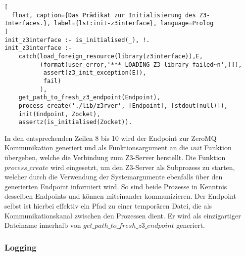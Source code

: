 \begin{lstlisting}[
  float, caption={Das Prädikat zur Initialisierung des Z3-Interfaces.}, label={lst:init-z3interface}, language=Prolog
]
init_z3interface :- is_initialised(_), !.
init_z3interface :-
    catch(load_foreign_resource(library(z3interface)),E,
          (format(user_error,'*** LOADING Z3 library failed~n',[]),
           assert(z3_init_exception(E)),
           fail)
          ),
    get_path_to_fresh_z3_endpoint(Endpoint),
    process_create('./lib/z3rver', [Endpoint], [stdout(null)]),
    init(Endpoint, Zocket),
    assertz(is_initialised(Zocket)).
\end{lstlisting}

In den entsprechenden Zeilen 8 bis 10 wird der Endpoint zur ZeroMQ Kommunikation generiert
und als Funktionsargument an die $init$ Funktion übergeben, welche die Verbindung zum Z3-Server herstellt.
Die Funktion $process\_create$ wird eingesetzt, um den Z3-Server als Subprozess zu starten,
welcher durch die Verwendung der Systemargumente ebenfalls über den generierten Endpoint informiert wird.
So sind beide Prozesse in Kenntnis desselben Endpoints und können miteinander kommunizieren.
Der Endpoint selbst ist hierbei effektiv ein Pfad zu einer temporären Datei, die als Kommunikationskanal zwischen den Prozessen dient.
Er wird als einzigartiger Dateiname innerhalb von $get\_path\_to\_fresh\_z3\_endpoint$ generiert.

\subsubsection{Logging}
\label{subsec:logging}

